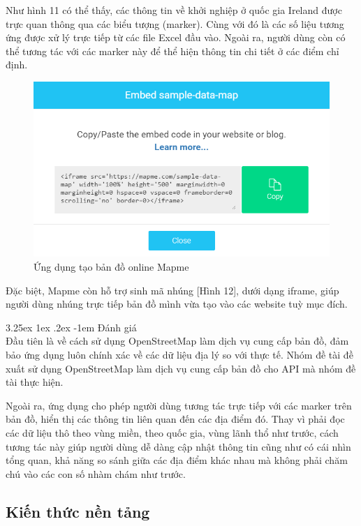 \documentclass[12pt,a4paper]{article}
\makeatletter
\newcommand{\myparagraph}[1]{\paragraph{#1}\mbox{}\\} %
\renewcommand\paragraph{\@startsection{paragraph}{5}{\z@}%
  {3.25ex \@plus1ex \@minus.2ex}%
  {-1em}%
  {\normalfont\normalsize\bfseries}}
\makeatother
\begin{document}
Như hình 11 có thể thấy, các thông tin về khởi nghiệp ở quốc gia Ireland được trực quan thông qua các biểu tượng (marker). Cùng với đó là các số liệu tương ứng được xử lý trực tiếp từ các file Excel đầu vào.
Ngoài ra, người dùng còn có thể tương tác với các marker này để thể hiện thông tin chi tiết ở các điểm chỉ định.

\begin{figure}[htp]
	\begin{center}
    \includegraphics[scale=.8]{image/mapmeExport}
    \caption{Ứng dụng tạo bản đồ online Mapme}
    \label{fig:mapmeExport}
	\end{center}
\end{figure}

Đặc biệt, Mapme còn hỗ trợ sinh mã nhúng [Hình 12], dưới dạng iframe, giúp người dùng nhúng trực tiếp bản đồ mình vừa tạo vào các website tuỳ mục đích.

\myparagraph{Đánh giá}
Đầu tiên là về cách sử dụng OpenStreetMap làm dịch vụ cung cấp bản đồ, đảm bảo ứng dụng luôn chính xác về các dữ liệu địa lý so với thực tế. Nhóm đề tài đề xuất sử dụng OpenStreetMap làm dịch vụ cung cấp bản đồ cho API mà nhóm đề tài thực hiện.

Ngoài ra, ứng dụng cho phép người dùng tương tác trực tiếp với các marker trên bản đồ, hiển thị các thông tin liên quan đến các địa điểm đó. Thay vì phải đọc các dữ liệu thô theo vùng miền, theo quốc gia, vùng lãnh thổ như trước, cách tương tác này giúp người dùng dễ dàng cập nhật thông tin cũng như có cái nhìn tổng quan, khả năng so sánh giữa các địa điểm khác nhau mà không phải chăm chú vào các con số nhàm chám như trước.

\subsection{Kiến thức nền tảng}
\end{document}
